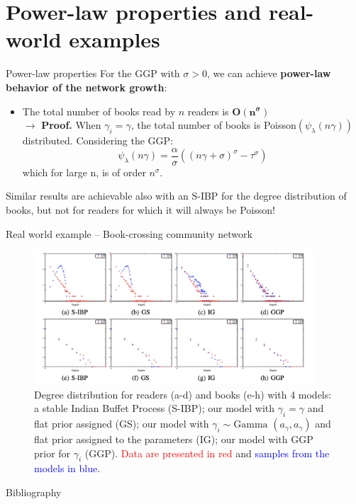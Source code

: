 \documentclass[aspectratio=169,xcolor=dvipsnames]{beamer}
\begin{document}
\section{Power-law properties and real-world examples}
\begin{frame}{Power-law properties}
For the GGP with $\sigma>0$, we can achieve \textbf{power-law behavior of the network growth}:
\begin{itemize}
    \item The total number of books read by $n$ readers is $\boldsymbol{O(n^{\sigma})}$ \\
    
    $\rightarrow$ \textbf{Proof.} When $\gamma_i=\gamma$, the total number of books is Poisson$(\psi_{\lambda}(n\gamma))$ distributed. Considering the GGP:
    $$
    \psi_{\lambda}(n\gamma) = \frac{\alpha}{\sigma}((n\gamma+\sigma)^{\sigma} -\tau^{\sigma})
    $$
    which for large n, is of order $n^{\sigma}$.
\end{itemize}
Similar results are achievable also with an S-IBP for the degree distribution of books, but not for readers for which it will always be Poisson!

\end{frame}
\begin{frame}{Real world example – Book-crossing community network}
\begin{figure}
    \centering
    \includegraphics[keepaspectratio, height = 5cm]{utilities/movies_actors.png}
    \caption{Degree distribution  for readers (a-d) and books (e-h) with 4 models: a stable Indian Buffet Process (S-IBP); our model with $\gamma_{i}=\gamma$ and flat prior assigned (GS); our model with $\gamma_{i} \sim \text{Gamma}$ $(a_{\gamma}, a_{\gamma})$ and flat prior assigned to the parameters (IG); our model with GGP prior for $\gamma_{i}$ (GGP). \textcolor{red}{Data are presented in red } and \textcolor{blue}{samples from the models in blue}.}
    \label{fig:movies}
\end{figure}

    
\end{frame}
\begin{frame}[allowframebreaks]{Bibliography}

\nocite{Caron2012BayesianNM, cinlar2011probability, James_Lijoi_Pruenster_2009, kingman_93}

\end{frame}

\end{document}
